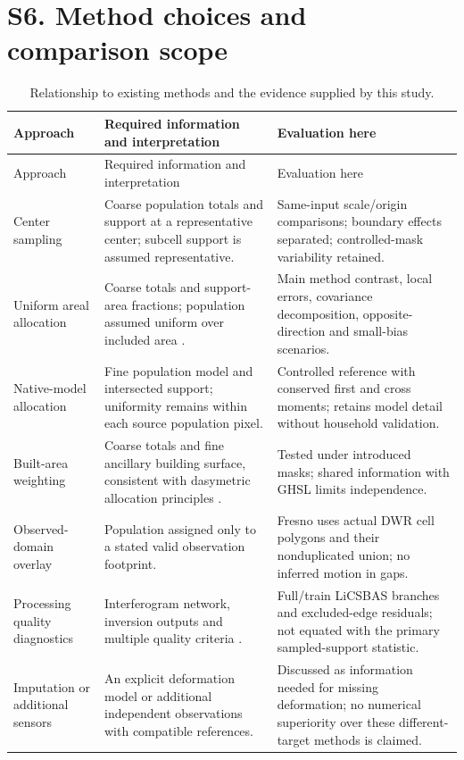 \documentclass[10pt,a4paper]{article}
\begin{document}
\section*{S6. Method choices and comparison scope}
\begin{longtable}{p{.19\linewidth}p{.34\linewidth}p{.38\linewidth}}
\caption{Relationship to existing methods and the evidence supplied by this study.}\\
\toprule Approach & Required information and interpretation & Evaluation here\\\midrule\endfirsthead
\toprule Approach & Required information and interpretation & Evaluation here\\\midrule\endhead
Center sampling & Coarse population totals and support at a representative center; subcell support is assumed representative. & Same-input scale/origin comparisons; boundary effects separated; controlled-mask variability retained.\\
Uniform areal allocation & Coarse totals and support-area fractions; population assumed uniform over included area \citep{eicher2001dasymetric}. & Main method contrast, local errors, covariance decomposition, opposite-direction and small-bias scenarios.\\
Native-model allocation & Fine population model and intersected support; uniformity remains within each source population pixel. & Controlled reference with conserved first and cross moments; retains model detail without household validation.\\
Built-area weighting & Coarse totals and fine ancillary building surface, consistent with dasymetric allocation principles \citep{mennis2003population}. & Tested under introduced masks; shared information with GHSL limits independence.\\
Observed-domain overlay & Population assigned only to a stated valid observation footprint. & Fresno uses actual DWR cell polygons and their nonduplicated union; no inferred motion in gaps.\\
Processing quality diagnostics & Interferogram network, inversion outputs and multiple quality criteria \citep{morishita2020licsbas,yunjun2019mintpy}. & Full/train LiCSBAS branches and excluded-edge residuals; not equated with the primary sampled-support statistic.\\
Imputation or additional sensors & An explicit deformation model or additional independent observations with compatible references. & Discussed as information needed for missing deformation; no numerical superiority over these different-target methods is claimed.\\\bottomrule
\end{longtable}
\end{document}
